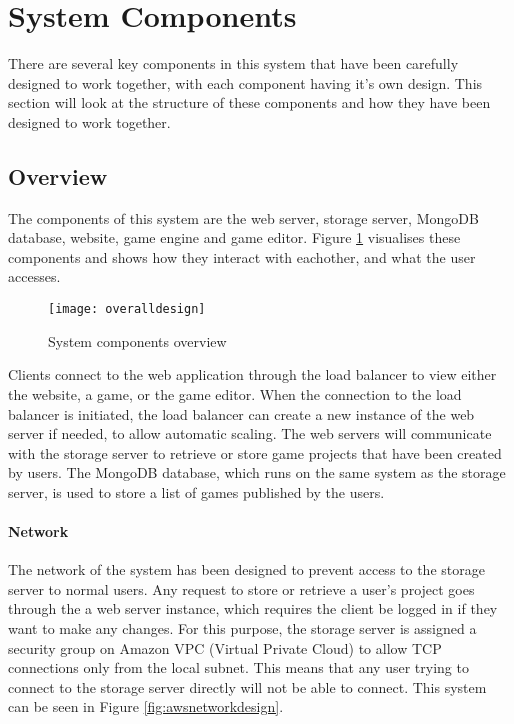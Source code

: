 
\section{System Components}
There are several key components in this system that have been carefully designed to work together, with each component having it's own design. This section will look at the structure of these components and how they have been designed to work together.

	\subsection{Overview}
	The components of this system are the web server, storage server, MongoDB database, website, game engine and game editor. Figure \ref{fig:overalldesign} visualises these components and shows how they interact with eachother, and what the user accesses.

	\begin{figure}[h]
		\centering
		\texttt{[image: overalldesign]}
		\caption{System components overview}
		\label{fig:overalldesign}
	\end{figure}

	Clients connect to the web application through the load balancer to view either the website, a game, or the game editor. When the connection to the load balancer is initiated, the load balancer can create a new instance of the web server if needed, to allow automatic scaling. The web servers will communicate with the storage server to retrieve or store game projects that have been created by users. The MongoDB database, which runs on the same system as the storage server, is used to store a list of games published by the users.

	\paragraph{Network}
	The network of the system has been designed to prevent access to the storage server to normal users. Any request to store or retrieve a user's project goes through the a web server instance, which requires the client be logged in if they want to make any changes. For this purpose, the storage server is assigned a security group on Amazon VPC (Virtual Private Cloud) to allow TCP connections only from the local subnet. This means that any user trying to connect to the storage server directly will not be able to connect. This system can be seen in Figure \ref{fig:awsnetworkdesign}.

